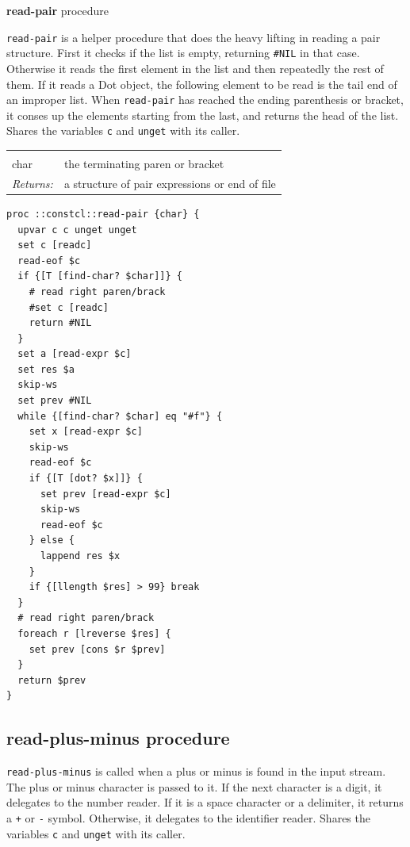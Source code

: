 \documentclass[twoside,9pt]{report}
\begin{document}
\textbf{read-pair} procedure


\texttt{read-pair} is a helper procedure that does the heavy lifting in reading a pair structure. First it checks if the list is empty, returning \texttt{\#NIL} in that case. Otherwise it reads the first element in the list and then repeatedly the rest of them. If it reads a Dot object, the following element to be read is the tail end of an improper list. When \texttt{read-pair} has reached the ending parenthesis or bracket, it conses up the elements starting from the last, and returns the head of the list. Shares the variables \texttt{c} and \texttt{unget} with its caller.

\noindent\begin{tabular}{ |p{1.9cm} p{8cm}| }
\hline
\rowcolor[HTML]{CCCCCC} \multicolumn{2}{|l|}{\bf read-pair (internal)} \\
char & the terminating paren or bracket \\
\textit{Returns:} & a structure of pair expressions or end of file \\
\hline
\end{tabular}
\begin{lstlisting}
proc ::constcl::read-pair {char} {
  upvar c c unget unget
  set c [readc]
  read-eof $c
  if {[T [find-char? $char]]} {
    # read right paren/brack
    #set c [readc]
    return #NIL
  }
  set a [read-expr $c]
  set res $a
  skip-ws
  set prev #NIL
  while {[find-char? $char] eq "#f"} {
    set x [read-expr $c]
    skip-ws
    read-eof $c
    if {[T [dot? $x]]} {
      set prev [read-expr $c]
      skip-ws
      read-eof $c
    } else {
      lappend res $x
    }
    if {[llength $res] > 99} break
  }
  # read right paren/brack
  foreach r [lreverse $res] {
    set prev [cons $r $prev]
  }
  return $prev
}
\end{lstlisting}
\subsection{read-plus-minus procedure}
\label{read-plus-minus-procedure}


\texttt{read-plus-minus} is called when a plus or minus is found in the input stream. The plus or minus character is passed to it. If the next character is a digit, it delegates to the number reader. If it is a space character or a delimiter, it returns a \texttt{+} or \texttt{-} symbol. Otherwise, it delegates to the identifier reader. Shares the variables \texttt{c} and \texttt{unget} with its caller.
\end{document}
